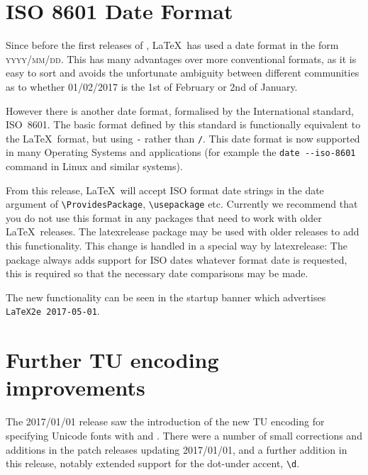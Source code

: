 \documentclass{ltnews}
\begin{document}
\maketitle
\tableofcontents

\setlength{}

\section{ISO 8601 Date Format}
Since before the first releases of \LaTeXe, \LaTeX\ has used a date
format in the form \textsc{yyyy/mm/dd}. This has many advantages over more
conventional formats, as it is easy to sort and avoids the unfortunate
ambiguity between different communities as to whether 01/02/2017 is the
1st of February or 2nd of January.

However there is another date format, formalised by the
International standard, ISO~8601. The basic format defined by this
standard is functionally equivalent to the \LaTeX\ format, but using
\texttt{-} rather than \texttt{/}. This date format is now supported
in many Operating Systems and applications
(for example the \verb|date --iso-8601| command in Linux and similar systems).

From this release, \LaTeX\ will accept ISO format date strings in the
date argument of \verb|\ProvidesPackage|, \verb|\usepackage| etc.
Currently we recommend that you do not use this format in any packages
that need to work with older \LaTeX\ releases. 
The \textsf{latexrelease} package may be used with older releases to
 add this functionality. This change is handled in a special way  by
 \textsf{latexrelease}: The package always adds support for ISO dates
whatever format date is requested, this is required so that the
necessary date comparisons may be made.

The new functionality can be seen in the startup banner which
advertises \texttt{LaTeX2e 2017-05-01}.

\section{Further TU encoding improvements}
The 2017/01/01 release saw the introduction of the new TU encoding for
specifying Unicode fonts with  and
. There were a number of small corrections and additions
in the patch releases updating 2017/01/01, and a further addition in
this release, notably extended support for the dot-under accent,
\verb|\d|.
\end{document}

